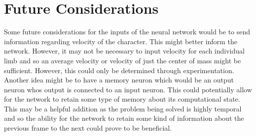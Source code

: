 \documentclass[letterpaper]{article} %
\begin{document}
\section{Future Considerations}
Some future considerations for the inputs of the neural network would be to send information regarding velocity of the character. This might better inform the network. However, it may not be necessary to input velocity for each individual limb and so an average velocity or velocity of just the center of mass might be sufficient. However, this could only be determined through experimentation.
\indent Another idea might be to have a memory neuron which would be an output neuron whos output is connected to an input neuron. This could potentially allow for the network to retain some type of memory about its computational state. This may be a helpful addition as the problem being solved is highly temporal and so the ability for the network to retain some kind of information about the previous frame to the next could prove to be beneficial.
\end{document}

